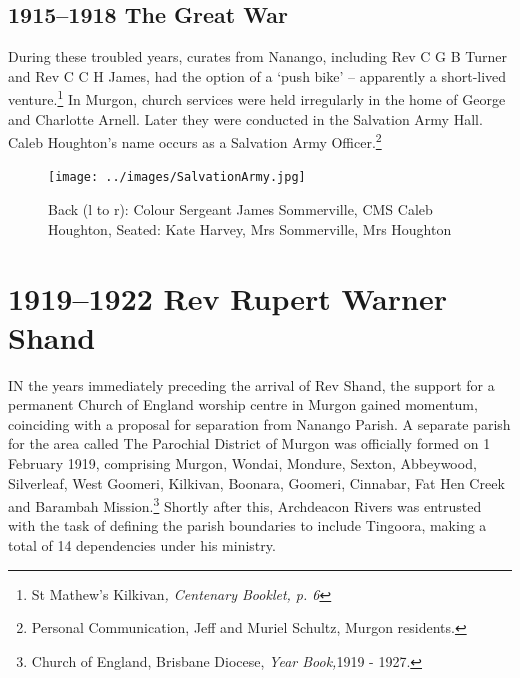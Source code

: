 \section{1915--1918 The Great War}



During these troubled years, curates from Nanango, including Rev C G B Turner and Rev C C H James, had the option of a `push bike' -- apparently a short-lived venture.\footnote{St Mathew's Kilkivan\emph{, Centenary Booklet, p. 6}} In Murgon, church services were held irregularly in the home of George and Charlotte Arnell. Later they were conducted in the Salvation Army Hall. Caleb Houghton's name occurs as a Salvation Army Officer.\footnote{Personal Communication, Jeff and Muriel Schultz, Murgon residents.}








\begin{figure}
\begin{center}
\texttt{[image: ../images/SalvationArmy.jpg]}
\caption{Back (l to r): Colour Sergeant James Sommerville, CMS Caleb Houghton, Seated: Kate Harvey, Mrs Sommerville, Mrs Houghton}
\end{center}
\end{figure}




\balance


\printendnotes[custom]
\setcounter{endnote}{0}
\chapter{1919--1922 Rev Rupert Warner Shand}
\nobalance


\lettrine[lines=3]{I}{N}
 the years immediately preceding the arrival of Rev Shand, the support for a permanent Church of England worship centre in Murgon gained momentum, coinciding with a proposal for separation from Nanango Parish. A separate parish for the area called The Parochial District of Murgon was officially formed on 1 February 1919, comprising Murgon, Wondai, Mondure, Sexton, Abbeywood, Silverleaf, West Goomeri, Kilkivan, Boonara, Goomeri, Cinnabar, Fat Hen Creek and Barambah Mission.\footnote{Church of England, Brisbane Diocese, \emph{Year Book,}1919 - 1927.} Shortly after this, Archdeacon Rivers was entrusted with the task of defining the parish boundaries to include Tingoora, making a total of 14 dependencies under his ministry.

